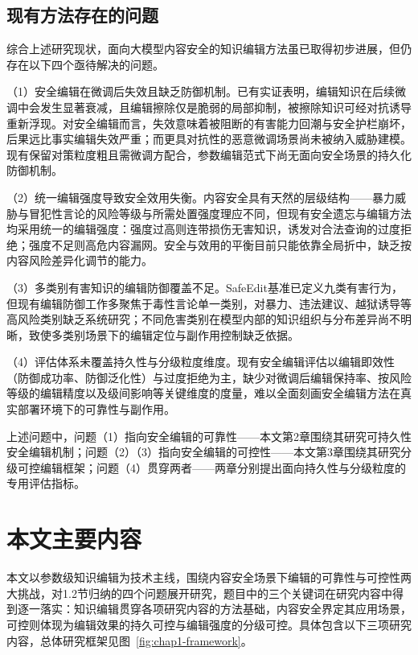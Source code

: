 \subsection{现有方法存在的问题}

综合上述研究现状，面向大模型内容安全的知识编辑方法虽已取得初步进展，但仍存在以下四个亟待解决的问题。

（1）安全编辑在微调后失效且缺乏防御机制。已有实证表明，编辑知识在后续微调中会发生显著衰减\cite{cheng2025finetune,wen2025retention}，且编辑擦除仅是脆弱的局部抑制，被擦除知识可经对抗诱导重新浮现\cite{basani2026illusion}。对安全编辑而言，失效意味着被阻断的有害能力回潮与安全护栏崩坏，后果远比事实编辑失效严重；而更具对抗性的恶意微调场景尚未被纳入威胁建模。现有保留对策粒度粗且需微调方配合，参数编辑范式下尚无面向安全场景的持久化防御机制。

（2）统一编辑强度导致安全效用失衡。内容安全具有天然的层级结构——暴力威胁与冒犯性言论的风险等级与所需处置强度理应不同，但现有安全遗忘与编辑方法\cite{shi2025cku}均采用统一的编辑强度：强度过高则连带损伤无害知识，诱发对合法查询的过度拒绝；强度不足则高危内容漏网。安全与效用的平衡目前只能依靠全局折中，缺乏按内容风险差异化调节的能力。

（3）多类别有害知识的编辑防御覆盖不足。SafeEdit基准\cite{wang2024safeedit}已定义九类有害行为，但现有编辑防御工作多聚焦于毒性言论单一类别\cite{lu2025toxedit}，对暴力、违法建议、越狱诱导等高风险类别缺乏系统研究；不同危害类别在模型内部的知识组织与分布差异尚不明晰，致使多类别场景下的编辑定位与副作用控制缺乏依据。

（4）评估体系未覆盖持久性与分级粒度维度。现有安全编辑评估以编辑即效性（防御成功率、防御泛化性\cite{wang2024safeedit}）与过度拒绝\cite{lu2025toxedit}为主，缺少对微调后编辑保持率、按风险等级的编辑精度以及级间影响等关键维度的度量，难以全面刻画安全编辑方法在真实部署环境下的可靠性与副作用。

上述问题中，问题（1）指向安全编辑的可靠性——本文第2章围绕其研究可持久性安全编辑机制；问题（2）（3）指向安全编辑的可控性——本文第3章围绕其研究分级可控编辑框架；问题（4）贯穿两者——两章分别提出面向持久性与分级粒度的专用评估指标。

\section{本文主要内容}

本文以参数级知识编辑为技术主线，围绕内容安全场景下编辑的可靠性与可控性两大挑战，对1.2节归纳的四个问题展开研究，题目中的三个关键词在研究内容中得到逐一落实：知识编辑贯穿各项研究内容的方法基础，内容安全界定其应用场景，可控则体现为编辑效果的持久可控与编辑强度的分级可控。具体包含以下三项研究内容，总体研究框架见图~\ref{fig:chap1-framework}。

